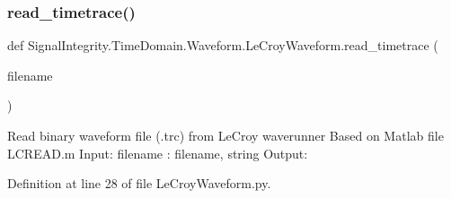 \subsubsection{\texorpdfstring{read\+\_\+timetrace()}{read\_timetrace()}}
{\footnotesize\ttfamily def Signal\+Integrity.\+Time\+Domain.\+Waveform.\+Le\+Croy\+Waveform.\+read\+\_\+timetrace (\begin{DoxyParamCaption}\item[{}]{filename }\end{DoxyParamCaption})}



Read binary waveform file (.trc) from Le\+Croy waverunner Based on Matlab file L\+C\+R\+E\+A\+D.\+m Input\+: filename \+: filename, string Output\+: 



Definition at line 28 of file Le\+Croy\+Waveform.\+py.

